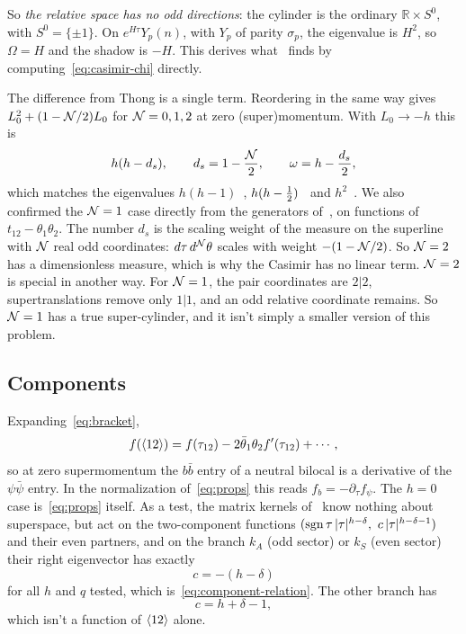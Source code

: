 So \emph{the relative space has no odd directions}: the cylinder is the ordinary $\mathbb R\times S^0$, with $S^0=\{\pm1\}$. On $e^{H\tau}Y_p(n)$, with $Y_p$ of parity $\sigma_p$, the eigenvalue is $H^2$, so $\Omega=H$ and the shadow is $-H$. This derives what~\cite{Bulycheva:2018qcp} finds by computing~\eqref{eq:casimir-chi} directly.

The difference from Thong is a single term. Reordering in the same way gives $L_0^2+(1-\mathcal{N}/2)L_0$ for $\mathcal{N}=0,1,2$ at zero (super)momentum. With $L_0\to-h$ this is
\begin{equation}\label{eq:pattern}
h(h-d_s),\qquad d_s=1-\frac{\mathcal{N}}{2},\qquad\omega=h-\frac{d_s}{2},
\end{equation}
which matches the eigenvalues $h(h-1)$~\cite{Maldacena:2016hyu}, $h(h-\tfrac12)$~\cite{Murugan:2017eto} and $h^2$~\cite{Bulycheva:2018qcp}. We also confirmed the $\mathcal{N}=1$ case directly from the generators of~\cite{Murugan:2017eto}, on functions of $t_{12}-\theta_1\theta_2$. The number $d_s$ is the scaling weight of the measure on the superline with $\mathcal{N}$ real odd coordinates: $d\tau\,d^{\mathcal{N}}\theta$ scales with weight $-(1-\mathcal{N}/2)$. So $\mathcal{N}=2$ has a dimensionless measure, which is why the Casimir has no linear term. $\mathcal{N}=2$ is special in another way. For $\mathcal{N}=1$, the pair coordinates are $2|2$, supertranslations remove only $1|1$, and an odd relative coordinate remains. So $\mathcal{N}=1$ has a true super-cylinder, and it isn't simply a smaller version of this problem.

\subsection{Components}

Expanding~\eqref{eq:bracket},
\begin{equation}\label{eq:component-relation}
f(\langle 12\rangle)=f(\tau_{12})-2\bar\theta_1\theta_2f'(\tau_{12})+\cdots,
\end{equation}
so at zero supermomentum the $b\bar b$ entry of a neutral bilocal is a derivative of the $\psi\bar\psi$ entry. In the normalization of~\eqref{eq:props} this reads $f_b=-\partial_\tau f_\psi$. The $h=0$ case is~\eqref{eq:props} itself. As a test, the matrix kernels of~\cite{Peng:2017spg} know nothing about superspace, but act on the two-component functions $(\sgn\tau\,|\tau|^{h-\delta},\ c\,|\tau|^{h-\delta-1})$ and their even partners, and on the branch $k_A$ (odd sector) or $k_S$ (even sector) their right eigenvector has exactly
\begin{equation}\label{eq:eigvec-bottom}
c=-(h-\delta)
\end{equation}
for all $h$ and $q$ tested, which is~\eqref{eq:component-relation}. The other branch has
\begin{equation}\label{eq:eigvec-top}
c=h+\delta-1,
\end{equation}
which isn't a function of $\langle 12\rangle$ alone.

